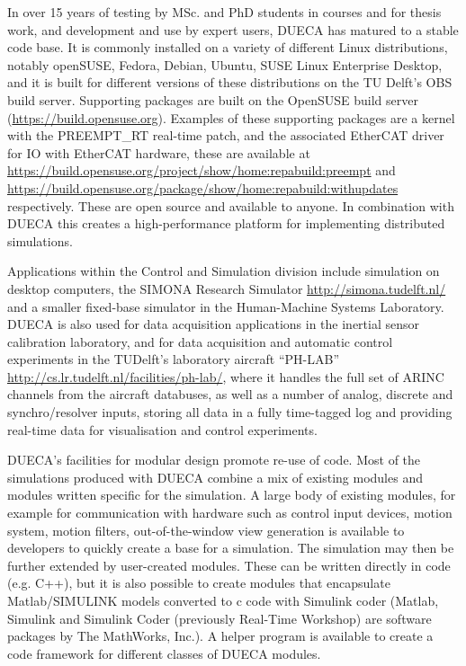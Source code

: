 \documentclass[11pt,a4paper,twoside]{scrartcl}
\begin{document}
In over 15 years of testing by MSc. and PhD students in courses and for thesis work, and development and use by expert users, DUECA has matured to a stable code base. It is commonly installed on a variety of different Linux distributions, notably openSUSE, Fedora, Debian, Ubuntu, SUSE Linux Enterprise Desktop, and it is built for different versions of these distributions on the TU Delft's OBS build server. Supporting packages are built on the OpenSUSE build server (\url{https://build.opensuse.org}). Examples of these supporting packages are a kernel with the PREEMPT\_RT real-time patch, and the associated EtherCAT driver for IO with EtherCAT hardware, these are available at \url{https://build.opensuse.org/project/show/home:repabuild:preempt} and \url{https://build.opensuse.org/package/show/home:repabuild:withupdates} respectively. These are open source and available to anyone. In combination with DUECA this creates a high-performance platform for implementing distributed simulations.

Applications within the Control and Simulation division include simulation on desktop computers, the SIMONA Research Simulator \url{http://simona.tudelft.nl/} and a smaller fixed-base simulator in the Human-Machine Systems Laboratory. DUECA is also used for data acquisition applications in the inertial sensor calibration laboratory, and for data acquisition and automatic control experiments in the TUDelft's laboratory aircraft ``PH-LAB'' \url{http://cs.lr.tudelft.nl/facilities/ph-lab/}, where it handles the full set of ARINC channels from the aircraft databuses, as well as a number of analog, discrete and synchro/resolver inputs, storing all data in a fully time-tagged log and providing real-time data for visualisation and control experiments.

DUECA's facilities for modular design promote re-use of code. Most of the simulations produced with DUECA combine a mix of existing modules and modules written specific for the simulation. A large body of existing modules, for example for communication with hardware such as control input devices, motion system, motion filters, out-of-the-window view generation is available to developers to quickly create a base for a simulation. The simulation may then be further extended by user-created modules. These can be written directly in code (e.g. C++), but it is also possible to create modules that encapsulate Matlab/SIMULINK models converted to c code with Simulink coder (Matlab, Simulink and Simulink Coder (previously Real-Time Workshop) are software packages by The MathWorks, Inc.). A helper program is available to create a code framework for different classes of DUECA modules.
\end{document}
